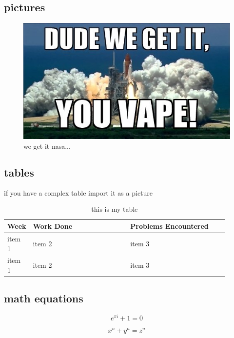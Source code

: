 \subsection{pictures}
\begin{figure}[hp]
	\centering
	\includegraphics[scale=.9]{meme.jpg}
	\caption{we get it nasa...}
\end{figure}

\subsection{tables}
if you have a complex table import it as a picture
\\%

\begin{table}[hp]
\centering
\begin{tabular} {l p{0.45\linewidth} p{0.45\linewidth}} \textbf{Week} & \textbf{Work Done} & \textbf{Problems Encountered}\\\hline
item 1 & item 2 & item 3 \\
item 1 & item 2 & item 3 \\
\end{tabular}
\caption{this is my table}
\end{table}

\subsection{math equations}

\[
e^{\pi i} + 1 = 0
\]

\[
x^n + y^n = z^n
\]


